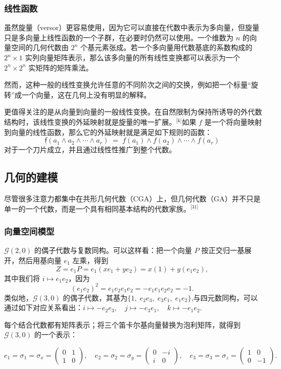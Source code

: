 \subsubsection{线性函数}
虽然旋量（versor）更容易使用，因为它可以直接在代数中表示为多向量，但旋量只是多向量上线性函数的一个子群，在必要时仍然可以使用。一个维数为 $n$ 的向量空间的几何代数由 $2^{n}$ 个基元素张成。若一个多向量用代数基底的系数构成的 $2^{n} \times 1$ 实列向量矩阵表示，那么该多向量的所有线性变换都可以表示为一个 $2^{n} \times 2^{n}$ 实矩阵的矩阵乘法。

然而，这种一般的线性变换允许任意的不同阶次之间的交换，例如把一个标量“旋转”成一个向量，这在几何上没有明显的解释。

更值得关注的是从向量到向量的一般线性变换。在自然限制为保持所诱导的外代数结构时，该线性变换的外延映射就是旋量的唯一扩展。\(^\text{[k]}\)如果 $f$ 是一个将向量映射到向量的线性函数，那么它的外延映射就是满足如下规则的函数：
$$
\underline{\mathsf{f}}(a_{1}\wedge a_{2}\wedge \cdots \wedge a_{r}) \;=\; f(a_{1}) \wedge f(a_{2}) \wedge \cdots \wedge f(a_{r})~
$$
对于一个刀片成立，并且通过线性性推广到整个代数。
\subsection{几何的建模}
尽管很多注意力都集中在共形几何代数（CGA）上，但几何代数（GA）并不只是单一的一个代数，而是一个具有相同基本结构的代数家族。\(^\text{[31]}\)
\subsubsection{向量空间模型}
$\mathcal{G}(2,0)$ 的偶子代数与复数同构。可以这样看：把一个向量 $P$ 按正交归一基展开，然后用基向量 $e_{1}$ 左乘，得到
$$
Z = e_{1}P = e_{1}(x e_{1} + y e_{2}) = x(1) + y(e_{1}e_{2}),~
$$
其中我们将 $i \mapsto e_{1}e_{2}$，因为
$$
(e_{1}e_{2})^{2} = e_{1}e_{2}e_{1}e_{2} = -e_{1}e_{1}e_{2}e_{2} = -1.~
$$
类似地，$\mathcal{G}(3,0)$ 的偶子代数，其基为$\{1, \; e_{2}e_{3}, \; e_{3}e_{1}, \; e_{1}e_{2}\}$,与四元数同构，可以通过如下对应关系看出：$i \mapsto -e_{2}e_{3}, \quad j \mapsto -e_{3}e_{1}, \quad k \mapsto -e_{1}e_{2}$.

每个结合代数都有矩阵表示；将三个笛卡尔基向量替换为泡利矩阵，就得到 $\mathcal{G}(3,0)$ 的一个表示：

$$
e_{1} = \sigma_{1} = \sigma_{x} =
\begin{pmatrix}
0 & 1 \\
1 & 0
\end{pmatrix}, \quad
e_{2} = \sigma_{2} = \sigma_{y} =
\begin{pmatrix}
0 & -i \\
i & 0
\end{pmatrix}, \quad
e_{3} = \sigma_{3} = \sigma_{z} =
\begin{pmatrix}
1 & 0 \\
0 & -1
\end{pmatrix}.~
$$
